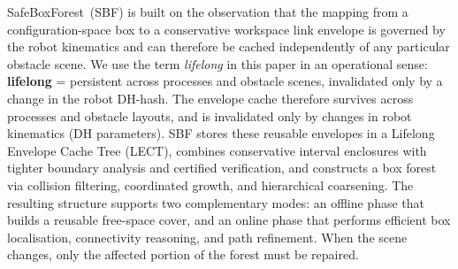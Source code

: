 \documentclass[journal]{IEEEtran}
\begin{document}
SafeBoxForest~(SBF) is built on the observation that the mapping from a
configuration-space box to a conservative workspace link envelope is
governed by the robot kinematics and can therefore be cached
independently of any particular obstacle scene.
We use the term \emph{lifelong} in this paper in an operational sense:
\textbf{lifelong} = persistent across processes and obstacle scenes,
invalidated only by a change in the robot DH-hash. The envelope cache
therefore survives across processes and obstacle layouts, and is
invalidated only by changes in robot kinematics (DH parameters).
SBF stores these reusable envelopes in a Lifelong Envelope Cache Tree
(LECT), combines conservative interval enclosures with tighter boundary
analysis and certified verification, and constructs a box forest via
collision filtering, coordinated growth, and hierarchical coarsening.
The resulting structure supports two complementary modes: an offline
phase that builds a reusable free-space cover, and an online phase that
performs efficient box localisation, connectivity reasoning, and path
refinement.
When the scene changes, only the affected portion of the forest must be
repaired.
\end{document}
